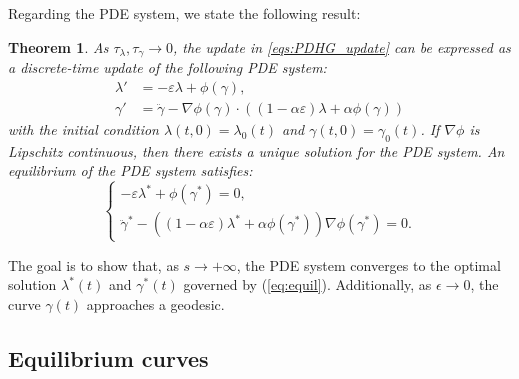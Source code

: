\documentclass[12pt]{amsart}
\newtheorem{theorem}{Theorem}
\theoremstyle{definition}
\theoremstyle{remark}
\numberwithin{equation}{section}
\numberwithin{equation}{section}
\begin{document}
Regarding the PDE system, we state the following result:  
\begin{theorem} As $\tau_\lambda, \tau_\gamma \to 0$, the update in \ref{eqs:PDHG_update} can be expressed as a discrete-time update of the following PDE system:
\begin{align*}
        \lambda' & = -\varepsilon\lambda + \phi(\gamma),\\
        \gamma' & = \ddot{\gamma} - \nabla\phi(\gamma)\cdot((1-\alpha\varepsilon)\lambda + \alpha\phi(\gamma))
    \end{align*}
    with the initial condition $\lambda(t, 0)=\lambda_0(t)$ and $\gamma(t, 0)=\gamma_0(t)$. If $\nabla \phi$ is Lipschitz continuous, then there exists a unique solution for the PDE system. An equilibrium of the PDE system satisfies: 
  \begin{equation}\label{eq:equil}
      \begin{cases}
        -\varepsilon\lambda^* +\phi(\gamma^*) = 0, \\
        \ddot{\gamma}^* - ((1-\alpha\varepsilon)\lambda^*+\alpha\phi(\gamma^*))\nabla\phi(\gamma^*) = 0.
        \end{cases}
    \end{equation}
\end{theorem}
The goal is to show that, as $s\to +\infty$, the PDE system converges to the optimal solution $\lambda^*(t)$ and $\gamma^*(t)$ governed by (\ref{eq:equil}).  Additionally, as $\epsilon \to 0$, the curve  $\gamma(t)$ approaches a geodesic.  

\subsection{Equilibrium curves}
\end{document}
